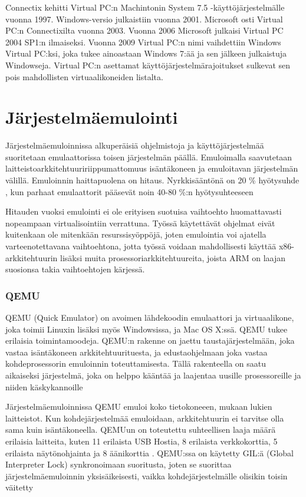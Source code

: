 Connectix kehitti Virtual PC:n Machintonin System 7.5 -käyttöjärjestelmälle vuonna 1997. Windows-versio julkaistiin vuonna 2001. Microsoft osti Virtual PC:n Connectixilta vuonna 2003. Vuonna 2006 Microsoft julkaisi Virtual PC 2004 SP1:n ilmaiseksi. Vuonna 2009 Virtual PC:n nimi vaihdettiin Windows Virtual PC:ksi, joka tukee ainoastaan Windows 7:ää ja sen jälkeen julkaistuja Windowseja. Virtual PC:n asettamat käyttöjärjestelmärajoitukset sulkevat sen pois mahdollisten virtuaalikoneiden listalta.


\section{Järjestelmäemulointi}
Järjestelmäemuloinnissa alkuperäisiä ohjelmistoja ja käyttöjärjestelmää suoritetaan emulaattorissa toisen järjestelmän päällä. Emuloimalla saavutetaan laitteistoarkkitehtuuririippumattomuus isäntäkoneen ja emuloitavan järjestelmän välillä. Emuloinnin haittapuolena on hitaus. Nyrkkisääntönä on 20 \% hyötysuhde \citep{tinycc}, kun parhaat emulaattorit pääsevät noin 40-80 \%:n hyötysuhteeseen \cite{40pperf}

Hitauden vuoksi emulointi ei ole erityisen suotuisa vaihtoehto huomattavasti nopeampaan virtualisointiin verrattuna. Työssä käytettävät ohjelmat eivät kuitenkaan ole mitenkään resurssisyöppöjä, joten emulointia voi ajatella varteenotettavana vaihtoehtona, jotta työssä voidaan mahdollisesti käyttää x86-arkkitehtuurin lisäksi muita prosessoriarkkitehtuureita, joista ARM on laajan suosionsa takia vaihtoehtojen kärjessä.

\subsubsection{QEMU}
QEMU (Quick Emulator) on avoimen lähdekoodin emulaattori ja virtuaalikone, joka toimii Linuxin lisäksi myös Windowsissa, ja Mac OS X:ssä. QEMU tukee erilaisia toimintamoodeja. QEMU:n rakenne on jaettu taustajärjestelmään, joka vastaa isäntäkoneen arkkitehtuurituesta, ja edustaohjelmaan joka vastaa kohdeprosessorin emuloinnin toteuttamisesta. Tällä rakenteella on saatu aikaiseksi järjestelmä, joka on helppo kääntää ja laajentaa uusille prosessoreille ja niiden käskykannoille \citep{qemu_doc}

Järjestelmäemuloinnissa QEMU emuloi koko tietokoneeen, mukaan lukien laitteistot. Kun kohdejärjestelmää emuloidaan, arkkitehtuurin ei tarvitse olla sama kuin isäntäkoneella. QEMUun on toteutettu suhteellisen laaja määrä erilaisia laitteita, kuten 11 erilaista USB Hostia, 8 erilaista verkkokorttia, 5 erilaista näytönohjainta ja 8 äänikorttia \citep{qemu_doc}. QEMU:ssa on käytetty GIL:ä (Global Interpreter Lock) synkronoimaan suoritusta, joten se suorittaa järjestelmäemuloinnin yksisäikeisesti, vaikka kohdejärjestelmälle olisikin toisin väitetty \cite{qemu_tech}

